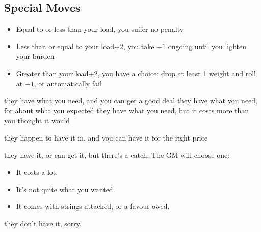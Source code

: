\subsection{Special Moves}

\begin{itemize}
\item Equal to or less than your load, you suffer no penalty
\item Less than or equal to your load+2, you take $-1$ ongoing until you lighten your burden
\item Greater than your load+2, you have a choice: drop at least 1 weight and roll at $-1$, or automatically fail
\end{itemize}

{they have what you need, and you can get a good deal}
{they have what you need, for about what you expected}
{they have what you need, but it costs more than you thought it would}

{they happen to have it in, and you can have it for the right price}
{they have it, or can get it, but there's a catch. The GM will choose one:
\begin{itemize}
\item It costs a lot.
\item It's not quite what you wanted.
\item It comes with strings attached, or a favour owed.
\end{itemize}}
{they don't have it, sorry.}